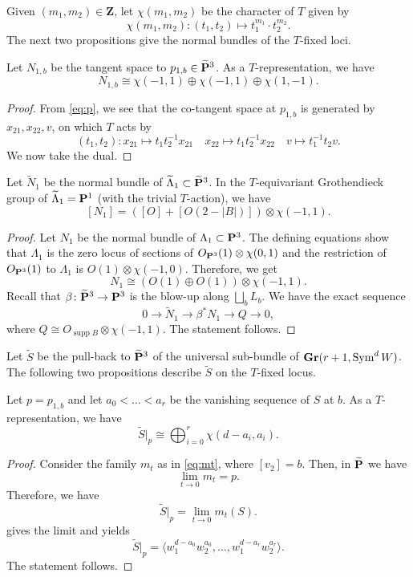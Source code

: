 \documentclass[11pt]{amsart}
\renewcommand {\P}{{\bf P}}
\providecommand {\Gr}{{\bf Gr}}
\providecommand{\Sym}{\operatorname{Sym}}
\providecommand{\supp}{\operatorname{supp}}
\begin{document}
Given \((m_{1},m_{2}) \in \mathbf{Z}\), let \(\chi(m_1,m_2)\) be the character of \(T\) given by
\[ \chi(m_1,m_2) \colon (t_1,t_2) \mapsto t_{1}^{m_1} \cdot t_2^{m_2}.\]
The next two propositions give the normal bundles of the \(T\)-fixed loci.

\begin{proposition}\label{prop:normalp}
  Let \(N_{1,b}\) be the tangent space to \(p_{1,b} \in \widetilde{\P}^3\).
  As a \(T\)-representation, we have
  \[ N_{1,b} \cong \chi(-1,1) \oplus \chi(-1,1) \oplus \chi(1,-1). \]
\end{proposition}
\begin{proof}
  From \eqref{eq:p}, we see that the co-tangent space at \(p_{1,b}\) is generated by \(x_{21}, x_{22}, v\), on which \(T\) acts by
  \[ (t_1,t_2) \colon x_{21} \mapsto t_{1}t_2^{-1} x_{21} \quad x_{22} \mapsto t_1t_{2}^{-1}x_{22} \quad v \mapsto t_1^{-1}t_2v.\]
We now take the dual.
\end{proof}

\begin{proposition}\label{prop:normall}
  Let \(\widetilde N_{1}\) be the normal bundle of \(\widetilde \Lambda_1 \subset \widetilde{\P}^3\).
  In the \(T\)-equivariant Grothendieck group of \(\widetilde{\Lambda}_1 = \P^1\) (with the trivial \(T\)-action), we have
  \[ [N_1] = \left([O] + [O\left(2-|B|\right)]\right) \otimes \chi(-1,1).  \]
\end{proposition}
\begin{proof}
  Let \(N_{1}\) be the normal bundle of \(\Lambda_1 \subset \P^3\).
  The defining equations show that \(\Lambda_1\) is the zero locus of sections of \(O_{\P^3}(1) \otimes \chi(0,1)\) and the restriction of \(O_{\P^3}(1)\) to \(\Lambda_1\) is \(O(1) \otimes \chi(-1,0)\).
  Therefore, we get
  \[N_1 \cong \left( O(1) \oplus O(1) \right) \otimes \chi(-1,1).\]
  Recall that \(\beta \colon \widetilde \P^3 \to \P^3\) is the blow-up along \(\bigsqcup_b L_b\).
  We have the exact sequence
  \[ 0 \to \widetilde N_1 \to \beta^{*} N_1 \to Q \to 0,\]
  where \(Q \cong O_{\supp B} \otimes \chi(-1,1)\).
  The statement follows.
\end{proof}

Let \(\widetilde S\) be the pull-back to \(\widetilde \P^3\) of the universal sub-bundle of \(\Gr(r+1, \Sym^d W)\).
The following two propositions describe \(\widetilde S\) on the \(T\)-fixed locus.
\begin{proposition}\label{prop:sp}
  Let \(p = p_{1,b}\) and let \(a_0 < \dots < a_r\) be the vanishing sequence of \(S\) at \(b\).
  As a \(T\)-representation, we have
  \[ \widetilde S|_p \cong \bigoplus_{i=0}^{r} \chi(d-a_i, a_i).\]
\end{proposition}
\begin{proof}
  Consider the family \(m_t\) as in \eqref{eq:mt}, where \([v_2] = b\).
  Then, in \(\widetilde \P\) we have
  \[\lim_{t \to 0} m_t = p.\]
  Therefore, we have
  \[ \widetilde S|_p = \lim_{t \to 0} m_t(S).\]
   gives the limit and yields
  \[ \widetilde S|_p = \langle  w_1^{d-a_0}w_2^{a_0}, \dots, w_1^{d-a_r}w_2^{a_r}\rangle.\]
  The statement follows.
\end{proof}
\end{document}
